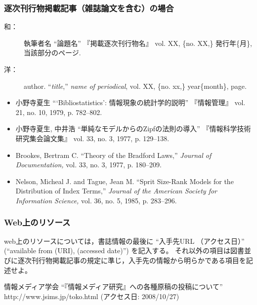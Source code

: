 		\subsubsection{逐次刊行物掲載記事（雑誌論文を含む）の場合}

			\begin{description}
				\item[和：] 執筆者名 ``論題名'' 『掲載逐次刊行物名』 vol. XX, \{no. XX,\} 発行年\{月\}, 当該部分のページ.
				\item[洋：] author. ``\textit{title},'' \textit{name of periodical}, vol. XX, \{no. xx,\} year\{month\}, page.
			\end{description}

			\begin{screen} \begin{itemize}
				\item 小野寺夏生 ```Bibliostatistics': 情報現象の統計学的説明'' 『情報管理』
				vol. 21, no. 10, 1979, p. 782--802.

				\item 小野寺夏生, 中井浩 ``単純なモデルからのZipfの法則の導入'' 『情報科学技術
				研究集会論文集』 vol. 33, no. 3, 1977, p. 129--138.

				\item Brookes, Bertram C. ``Theory of the Bradford Laws,'' \textit{Journal of
				Documentation,} vol. 33, no. 3, 1977, p. 180--209.

				\item Nelson, Micheal J. and Tague, Jean M. ``Sprit Size-Rank Models for the
				Distribution of Index Terms,'' \textit{Journal of the American Society
				for Information Science,} vol. 36, no. 5, 1985, p. 283--296.
			\end{itemize} \end{screen}

		\subsubsection{Web上のリソース}

			web上のリソースについては，書誌情報の最後に ``入手先URL （アクセス日）''
			(``available from (URI), (accessed date)'') を記入する。
			それ以外の項目は図書並びに逐次刊行物掲載記事の規定に準じ，入手先の情報から明らかである項目を記述せよ。

			\begin{screen}
				 情報メディア学会 ``『情報メディア研究』への各種原稿の投稿について'' http://www.jsims.jp/toko.html (アクセス日: 2008/10/27)
			\end{screen}
